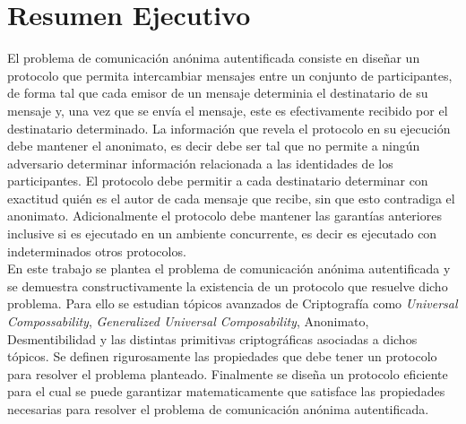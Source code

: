 \section{Resumen Ejecutivo}

El problema de comunicación anónima autentificada consiste en diseñar un protocolo
que permita intercambiar mensajes entre un conjunto de participantes, de forma tal
que cada emisor de un mensaje determinia el destinatario de su
mensaje y, una vez que se envía el mensaje,  este es efectivamente recibido por el destinatario
determinado. La información que revela el protocolo en su ejecución debe mantener el
anonimato, es decir debe ser tal que no permite a ningún adversario determinar 
información relacionada a las identidades  de los participantes.
El protocolo debe permitir a cada destinatario determinar con exactitud quién es el autor
de cada mensaje que recibe, sin que esto contradiga el anonimato.
Adicionalmente el protocolo debe mantener las garantías anteriores inclusive si es ejecutado en
un ambiente concurrente, es decir es ejecutado con indeterminados otros protocolos.\\
En este trabajo se plantea el problema de comunicación anónima autentificada y se
demuestra constructivamente la existencia de un protocolo que resuelve dicho problema.
Para ello se estudian tópicos avanzados de Criptografía como \textit{Universal
Compossability}, \textit{Generalized Universal Composability}, Anonimato,
Desmentibilidad y las distintas primitivas criptográficas asociadas a dichos tópicos.
Se definen rigurosamente las propiedades que debe tener un protocolo para
resolver el problema planteado.
Finalmente se diseña un protocolo eficiente para el cual se puede garantizar
matematicamente que satisface las propiedades necesarias para resolver el problema
de comunicación anónima autentificada.
